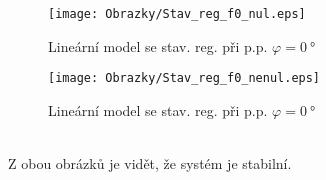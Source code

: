 \documentclass[a4paper, 12pt]{article}
\begin{document}
		\begin{figure}[h]
			\begin{center}
				\texttt{[image: Obrazky/Stav\_reg\_f0\_nul.eps]}
				\label{Stav_reg_f0_nul}
				\caption{Lineární model se stav. reg. při p.p. $\varphi = \SI{0}{\degree}$}
			\end{center}
			\begin{center}
				\texttt{[image: Obrazky/Stav\_reg\_f0\_nenul.eps]}
				\label{Stav_reg_f0_nenul}
				\caption{Lineární model se stav. reg. při p.p. $\varphi = \SI{0}{\degree}$}
			\end{center}
		\end{figure}
		\\Z obou obrázků je vidět, že systém je stabilní.
		
\end{document}
